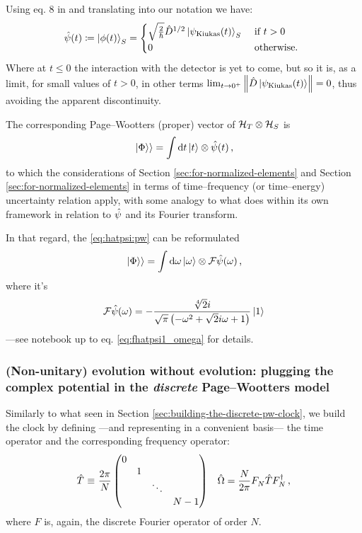 \citereset
Using eq. 8 in \cite{RuschhauptAbsorption} and translating into our notation we have:
\begin{equation}\label{eq:phi_psi_kiukas}
  \hat{\psi}(t) \coloneqq
  \ket{\phi(t)}_S =
  \begin{cases}
    \sqrt{\frac{2}{\hbar}} \hat{D}^{1/2} \ket{\psi_{\text{Kiukas}}(t)}_S &\text{ if } t > 0 \\
    0 &\text{ otherwise. }
  \end{cases}
\end{equation}
Where at $t \le 0$ the interaction with the detector is yet to come,
but so it is, as a limit, for small values of $t>0$,
in other terms
$\lim_{t \to 0^{+}} \norm{\hat{D} \ket{\psi_{\text{Kiukas}}(t)}} = 0$, thus avoiding the apparent discontinuity.

The corresponding Page--Wootters (proper) vector of $\mathcal{H}_T \otimes \mathcal{H}_S$ is
\begin{equation}\label{eq:hatpsi:pw}
  \left.\left| \Phi \right\rangle\right\rangle = \int \dd{t} \ket{t} \otimes \hat{\psi}(t) \,\text{,}
\end{equation}
to which the considerations of Section \ref{sec:for-normalized-elements}
and Section \ref{sec:for-normalized-elements} in terms of time--frequency
(or time--energy) uncertainty relation apply, with some analogy
to what \cite{RuschhauptAbsorption} does within its own framework
in relation to $\hat{\psi}$ and its Fourier transform.

In that regard, the \eqref{eq:hatpsi:pw} can be reformulated
\begin{equation}
  \left.\left| \Phi \right\rangle\right\rangle = \int \dd{\omega} \ket{\omega} \otimes \mathcal{F} \hat{\psi} (\omega) \,\text{,}
\end{equation}
where it's
\begin{equation}
  \mathcal{F} \hat{\psi} (\omega) = - \frac{\sqrt[4]{2} i}{\sqrt{\pi} \left(- \omega^{2} + \sqrt{2} i \omega + 1\right)} \ket{1}
\end{equation}
---see notebook up to eq. \eqref{eq:fhatpsi1_omega} for details.


\citereset
\subsubsection{
  (Non-unitary) evolution without evolution:
  plugging the complex potential in the \emph{discrete} Page--Wootters model
}

Similarly to what seen in Section \ref{sec:building-the-discrete-pw-clock}, we build
the clock by defining ---and representing in a convenient basis---
the time operator and the corresponding frequency operator:
\begin{align}
  \hat{T} \operatorname*{\,\equiv\,} \frac{2\pi}{N}
  \begin{pmatrix}
    0           &       &       &       \\
                &1      &       &       \\
                &       &\ddots &       \\
                &       &       &N-1
  \end{pmatrix}
  &&
  \hat{\Omega} = \frac{N}{2\pi} F^{}_{N} \hat{T} F^{\dagger}_{N} \, \text{,}
\end{align}
where $F$ is, again, the discrete Fourier operator of order $N$.

